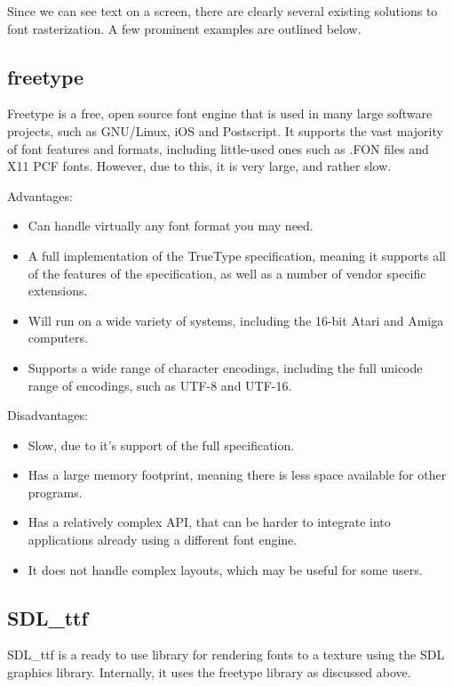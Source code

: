 \documentclass{report}
\begin{document}
Since we can see text on a screen, there are clearly several existing solutions
to font rasterization. A few prominent examples are outlined below.



\subsection{freetype}
Freetype is a free, open source font engine that is used in many large software
projects, such as GNU/Linux, iOS and Postscript. It supports the vast majority
of font features and formats, including little-used ones such as .FON files and
X11 PCF fonts. However, due to this, it is very large, and rather slow.

Advantages:
\begin{itemize}
\item{Can handle virtually any font format you may need.}
\item{A full implementation of the TrueType specification, meaning it supports
    all of the features of the specification, as well as a number of vendor
    specific extensions.}
\item{Will run on a wide variety of systems, including the 16-bit Atari and
    Amiga computers.}
\item{Supports a wide range of character encodings, including the full unicode
    range of encodings, such as UTF-8 and UTF-16.}
\end{itemize}

Disadvantages:
\begin{itemize}
\item{Slow, due to it's support of the full specification.}
\item{Has a large memory footprint, meaning there is less space available for
    other programs.}
\item{Has a relatively complex API, that can be harder to integrate into
    applications already using a different font engine.}
\item{It does not handle complex layouts, which may be useful for some users.}
\end{itemize}

\subsection{SDL\_ttf}
SDL\_ttf is a ready to use library for rendering fonts to a texture using the
SDL graphics library. Internally, it uses the freetype library as discussed above.
\end{document}
